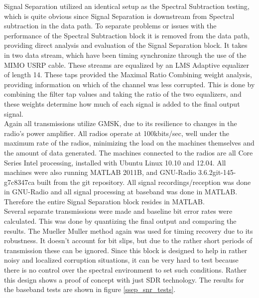 Signal Separation utilized an identical setup as the Spectral Subtraction testing, which is quite obvious since Signal Separation is downstream from Spectral subtraction in the data path.  To separate problems or issues with the performance of the Spectral Subtraction block it is removed from the data path, providing direct analysis and evaluation of the Signal Separation block.  It takes in two data stream, which have been timing synchronize through the use of the MIMO USRP cable.  These streams are equalized by an LMS Adaptive equalizer of length 14.  These taps provided the Maximal Ratio Combining weight analysis, providing information on which of the channel was less corrupted.  This is done by combining the filter tap values and taking the ratio of the two equalizers, and these weights determine how much of each signal is added to the final output signal.\\ 

Again all transmissions utilize GMSK, due to its resilience to changes in the radio's power amplifier.  All radios operate at 100kbits/sec, well under the maximum rate of the radios, minimizing the load on the machines themselves and the amount of data generated.  The machines connected to the radios are all Core Series Intel processing, installed with Ubuntu Linux 10.10 and 12.04.  All machines were also running MATLAB 2011B, and GNU-Radio 3.6.2git-145-g7c8347ca built from the git repository.  All signal recordings/reception was done in GNU-Radio and all signal processing at baseband was done in MATLAB.  Therefore the entire Signal Separation block resides in MATLAB.\\  

Several separate transmissions were made and baseline bit error rates were calculated.  This was done by quantizing the final output and comparing the results.  The Mueller Muller method again was used for timing recovery due to its robustness.  It doesn't account for bit slips, but due to the rather short periods of transmission these can be ignored.  Since this block is designed to help in rather noisy and localized corruption situations, it can be very hard to test because there is no control over the spectral environment to set such conditions.  Rather this design shows a proof of concept with just SDR technology.  The results for the baseband tests are shown in figure \ref{ssep_snr_tests}.\\


